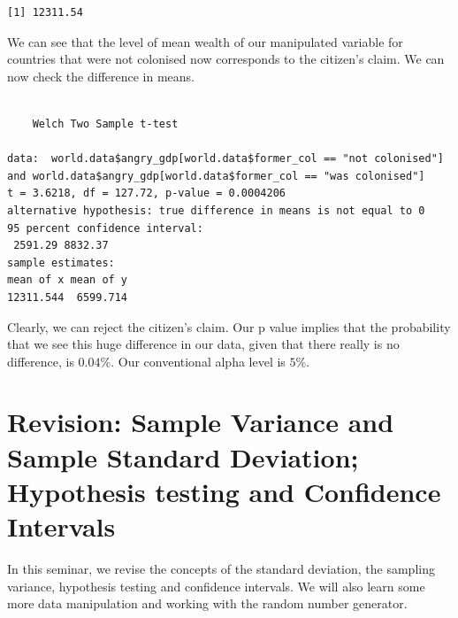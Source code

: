 \documentclass[]{article}
\newenvironment{Shaded}{\begin{snugshade}}{\end{snugshade}}
\newcommand{\KeywordTok}[1]{\textcolor[rgb]{0.13,0.29,0.53}{\textbf{#1}}}
\newcommand{\DataTypeTok}[1]{\textcolor[rgb]{0.13,0.29,0.53}{#1}}
\newcommand{\DecValTok}[1]{\textcolor[rgb]{0.00,0.00,0.81}{#1}}
\newcommand{\StringTok}[1]{\textcolor[rgb]{0.31,0.60,0.02}{#1}}
\newcommand{\OperatorTok}[1]{\textcolor[rgb]{0.81,0.36,0.00}{\textbf{#1}}}
\newcommand{\NormalTok}[1]{#1}
\theoremstyle{definition}
\theoremstyle{definition}
\theoremstyle{definition}
\theoremstyle{remark}
\begin{document}
\begin{verbatim}
[1] 12311.54
\end{verbatim}

We can see that the level of mean wealth of our manipulated variable for
countries that were not colonised now corresponds to the citizen's
claim. We can now check the difference in means.

\begin{Shaded}
\end{Shaded}

\begin{verbatim}

    Welch Two Sample t-test

data:  world.data$angry_gdp[world.data$former_col == "not colonised"] and world.data$angry_gdp[world.data$former_col == "was colonised"]
t = 3.6218, df = 127.72, p-value = 0.0004206
alternative hypothesis: true difference in means is not equal to 0
95 percent confidence interval:
 2591.29 8832.37
sample estimates:
mean of x mean of y 
12311.544  6599.714 
\end{verbatim}

Clearly, we can reject the citizen's claim. Our p value implies that the
probability that we see this huge difference in our data, given that
there really is no difference, is \(0.04\%\). Our conventional alpha
level is \(5\%\).

\section{Revision: Sample Variance and Sample Standard Deviation;
Hypothesis testing and Confidence
Intervals}\label{revision-sample-variance-and-sample-standard-deviation-hypothesis-testing-and-confidence-intervals}

In this seminar, we revise the concepts of the standard deviation, the
sampling variance, hypothesis testing and confidence intervals. We will
also learn some more data manipulation and working with the random
number generator.
\end{document}

